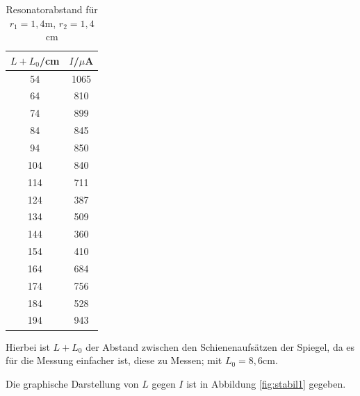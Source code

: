 \begin{table}[H]
	\begin{center}
		\begin{tabular}{c c}
			\toprule
			\(L+L_0\)/cm & \(I\)/\(\mu\)A \\
			\midrule
			54          &    1065\\
			64            &  810\\
			74             & 899\\
			84              &845\\
			94              &850\\
			104             &840 \\                                                                                    
			114             &711   \\                                                                                  
			124             &387     \\                                                                                
			134             &509       \\                                                                              
			144             &360         \\                                                                            
			154             &410           \\                                                                          
			164             &684             \\                                                                        
			174             &756               \\                                                                      
			184             &528                 \\                                                                    
			194             &943  \\
			\bottomrule
		\end{tabular}
		\caption{Resonatorabstand für \(r_1=1,4\text{m}\), \(r_2=1,4\)cm}
		\label{tab:t1}
	\end{center}
\end{table}

\noindent Hierbei ist \(L+L_0\) der Abstand zwischen den Schienenaufsätzen der Spiegel, da es für die Messung einfacher ist, diese zu Messen; mit \(L_0=8,6\text{cm}\).

\noindent Die graphische Darstellung von \(L\) gegen \(I\) ist in Abbildung \ref{fig:stabil1} gegeben.


